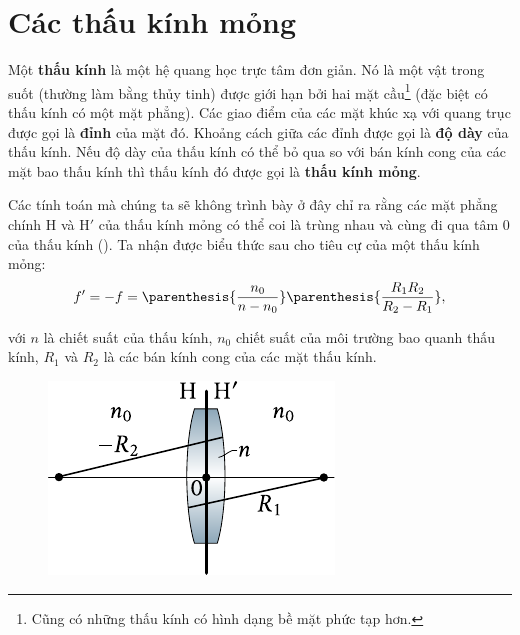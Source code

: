 \section{Các thấu kính mỏng}\label{sec:16_8}

Một \textbf{thấu kính} là một hệ quang học trực tâm đơn giản.
Nó là một vật trong suốt (thường làm bằng thủy tinh) được giới hạn bởi hai mặt cầu\footnote{Cũng có những thấu kính có hình dạng bề mặt phức tạp hơn.} (đặc biệt có thấu kính có một mặt phẳng).
Các giao điểm của các mặt khúc xạ với quang trục được gọi là \textbf{đỉnh} của mặt đó.
Khoảng cách giữa các đỉnh được gọi là \textbf{độ dày} của thấu kính.
Nếu độ dày của thấu kính có thể bỏ qua so với bán kính cong của các mặt bao thấu kính thì thấu kính đó được gọi là \textbf{thấu kính mỏng}.

Các tính toán mà chúng ta sẽ không trình bày ở đây chỉ ra rằng các mặt phẳng chính H và H$'$ của thấu kính mỏng có thể coi là trùng nhau và cùng đi qua tâm $0$ của thấu kính ().
Ta nhận được biểu thức sau cho tiêu cự của một thấu kính mỏng:
\begin{equation}\label{eq:16_66}
    f' = -f = \parenthesis{\frac{n_0}{n-n_0}} \parenthesis{\frac{R_1R_2}{R_2-R_1}},
\end{equation}

\noindent
với $n$ là chiết suất của thấu kính, $n_0$ chiết suất của môi trường bao quanh thấu kính, $R_1$ và $R_2$ là các bán kính cong của các mặt thấu kính.

\begin{figure}[!htb]
	\begin{center}
		\includegraphics[scale=1]{figures/ch_16/fig_16_19.pdf}
        \caption[]{}
		\label{fig:16_19}
	\end{center}
	\vspace{-0.8cm}
\end{figure}

